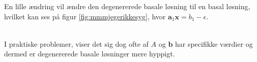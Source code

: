 En lille ændring vil ændre den degenererede basale løsning til en basal løsning, hvilket kan ses på figur \ref{fig:mmmjegerikkesyg}, hvor $\mathbf{a}_1 \mathbf{x} = b_1 - \epsilon$.
%
%
\begin{center}
$
\begin{array}{cc}
&

\end{array}
$
\end{center}
%
%
I praktiske problemer, viser det sig dog ofte af $A$ og $\mathbf{b}$ har specifikke værdier og dermed er degenererede basale løsninger mere hyppigt.
%